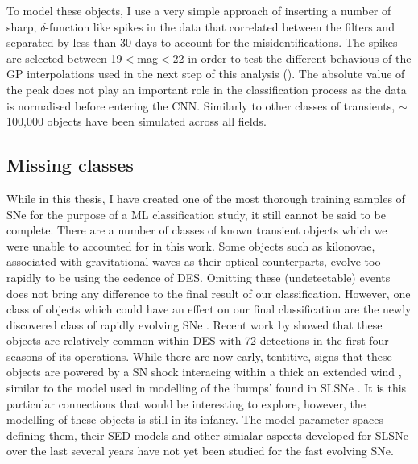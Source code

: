 \begin{figure}
  \caption{}
  \label{fig:BadSubtractions}
\end{figure}

To model these objects, I use a very simple approach of inserting a number of sharp, $\delta$-function like spikes in the data that correlated between the filters and separated by less than 30 days to account for the misidentifications. The spikes are selected between 19$<$mag$<$22 in order to test the different behavious of the GP interpolations used in the next step of this analysis (). The absolute value of the peak does not play an important role in the classification process as the data is normalised before entering the CNN. Similarly to other classes of transients, $\sim$100,000 objects have been simulated across all fields.

\subsection{Missing classes}
While in this thesis, I have created one of the most thorough training samples of SNe for the purpose of a ML classification study, it still cannot be said to be complete. There are a number of classes of known transient objects which we were unable to accounted for in this work. Some objects such as kilonovae, associated with gravitational waves as their optical counterparts, evolve too rapidly to be using the cedence of DES. Omitting these (undetectable) events does not bring any difference to the final result of our classification. However, one class of objects which could have an effect on our final classification are the newly discovered class of rapidly evolving SNe \cite{Drout2014,Kepler2018}. Recent work by \citet{Pursiainen2018} showed that these objects are relatively common within DES with 72 detections in the first four seasons of its operations. While there are now early, tentitive, signs \citep{Pursiainen2018} that these objects are powered by a SN shock interacing within a thick an extended wind \citep{Piro2015}, similar to the model used in modelling of the `bumps' found in SLSNe . It is this particular connections that would be interesting to explore, however, the modelling of these objects is still in its infancy. The model parameter spaces defining them, their SED models and other simialar aspects developed for SLSNe over the last several years have not yet been studied for the fast evolving SNe.

